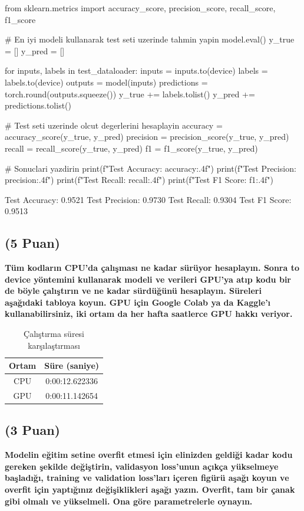 \documentclass[11pt]{article}
\begin{document}
\begin{python}
from sklearn.metrics import accuracy_score, precision_score, recall_score, f1_score

# En iyi modeli kullanarak test seti uzerinde tahmin yapin
model.eval()
y_true = []
y_pred = []

for inputs, labels in test_dataloader:
    inputs = inputs.to(device)
    labels = labels.to(device)
    outputs = model(inputs)
    predictions = torch.round(outputs.squeeze())
    y_true += labels.tolist()
    y_pred += predictions.tolist()

# Test seti uzerinde olcut degerlerini hesaplayin
accuracy = accuracy_score(y_true, y_pred)
precision = precision_score(y_true, y_pred)
recall = recall_score(y_true, y_pred)
f1 = f1_score(y_true, y_pred)

# Sonuclari yazdirin
print(f"Test Accuracy: {accuracy:.4f}")
print(f"Test Precision: {precision:.4f}")
print(f"Test Recall: {recall:.4f}")
print(f"Test F1 Score: {f1:.4f}")
\end{python}

Test Accuracy: 0.9521
Test Precision: 0.9730
Test Recall: 0.9304
Test F1 Score: 0.9513

\subsection{(5 Puan)} \textbf{Tüm kodların CPU'da çalışması ne kadar sürüyor hesaplayın. Sonra to device yöntemini kullanarak modeli ve verileri GPU'ya atıp kodu bir de böyle çalıştırın ve ne kadar sürdüğünü hesaplayın. Süreleri aşağıdaki tabloya koyun. GPU için Google Colab ya da Kaggle'ı kullanabilirsiniz, iki ortam da her hafta saatlerce GPU hakkı veriyor.}

\begin{table}[ht!]
    \centering
    \caption{Çalıştırma süresi karşılaştırması}
    \begin{tabular}{c|c}
        Ortam & Süre (saniye) \\\hline
        CPU &  0:00:12.622336 \\
        GPU &  0:00:11.142654\\
    \end{tabular}
    \label{tab:my_table}
\end{table}

\subsection{(3 Puan)} \textbf{Modelin eğitim setine overfit etmesi için elinizden geldiği kadar kodu gereken şekilde değiştirin, validasyon loss'unun açıkça yükselmeye başladığı, training ve validation loss'ları içeren figürü aşağı koyun ve overfit için yaptığınız değişiklikleri aşağı yazın. Overfit, tam bir çanak gibi olmalı ve yükselmeli. Ona göre parametrelerle oynayın.}
\end{document}
